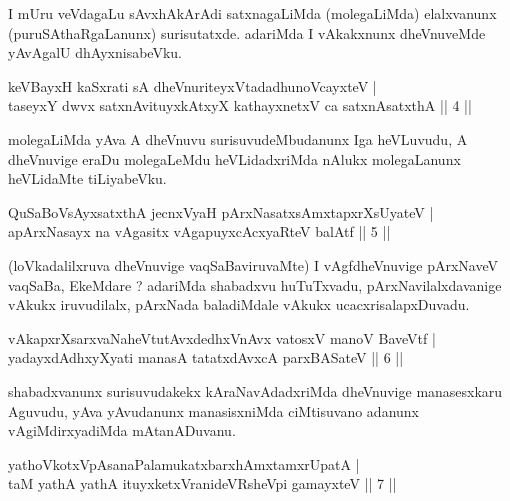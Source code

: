 \begin{artha}
I mUru veVdagaLu sAvxhAkArAdi satxnagaLiMda (molegaLiMda) elalxvanunx (puruSAthaRgaLanunx) surisutatxde. adariMda I vAkakxnunx dheVnuveMde yAvAgalU dhAyxnisabeVku.
\end{artha}


\begin{shl}
keVBayxH kaSxrati sA dheVnuriteyxVtadadhunoVcayxteV | \\
taseyxY dwvx satxnAvituyxkAtxyX kathayxnetxV ca satxnAsatxthA \hfill ||  4 ||
\end{shl}

\begin{artha}
molegaLiMda yAva A dheVnuvu surisuvudeMbudanunx Iga heVLuvudu, A dheVnuvige eraDu molegaLeMdu heVLidadxriMda nAlukx molegaLanunx heVLidaMte tiLiyabeVku.
\end{artha}


\begin{shl}
QuSaBoV\s sAyxsatxthA jecnxVyaH pArxNasatxsAmxtapxrXsUyateV | \\
apArxNasayx na vAgasitx vAgapuyxcAcxyaRteV balAtf \hfill ||  5 || 
\end{shl}

\begin{artha}
(loVkadalilxruva dheVnuvige vaqSaBaviruvaMte) I vAgfdheVnuvige pArxNaveV vaqSaBa, EkeMdare ? adariMda shabadxvu huTuTxvadu, pArxNavilalxdavanige vAkukx iruvudilalx, pArxNada baladiMdale vAkukx ucacxrisalapxDuvadu.
\end{artha}


\begin{shl}
vAkapxrXsarxvaNaheVtutAvxdedhxVnAvx vatosxV manoV BaveVtf | \\
yadayxdAdhxyXyati manasA tatatxdAvxcA parxBASateV \hfill ||  6 || 
\end{shl}

\begin{artha}
shabadxvanunx surisuvudakekx kAraNavAdadxriMda dheVnuvige manasesxkaru Aguvudu, yAva yAvudanunx manasisxniMda ciMtisuvano adanunx vAgiMdirxyadiMda mAtanADuvanu.
\end{artha}

\begin{shl}
yathoVkotxVpAsanaPalamukatxbarxhAmxtamxrUpatA | \\
taM yathA yathA ituyxketxVranideVRsheV\s pi gamayxteV \hfill ||  7 || 
\end{shl}

